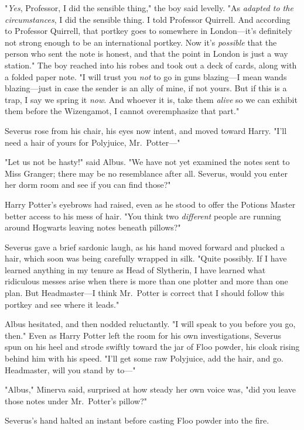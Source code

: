 "\emph{Yes}, Professor, I did the sensible thing," the boy said levelly. "As \emph{adapted to the circumstances}, I did the sensible thing. I told Professor Quirrell. And according to Professor Quirrell, that portkey goes to somewhere in London---it's definitely not strong enough to be an international portkey. Now it's \emph{possible} that the person who sent the note is honest, and that the point in London is just a way station." The boy reached into his robes and took out a deck of cards, along with a folded paper note. "I will trust you \emph{not} to go in guns blazing---I mean wands blazing---just in case the sender is an ally of mine, if not yours. But if this is a trap, I say we spring it \emph{now}. And whoever it is, take them \emph{alive} so we can exhibit them before the Wizengamot, I cannot overemphasize that part."

Severus rose from his chair, his eyes now intent, and moved toward Harry. "I'll need a hair of yours for Polyjuice, Mr.~Potter---"

"Let us not be hasty!" said Albus. "We have not yet examined the notes sent to Miss Granger; there may be no resemblance after all. Severus, would you enter her dorm room and see if you can find those?"

Harry Potter's eyebrows had raised, even as he stood to offer the Potions Master better access to his mess of hair. "You think two \emph{different} people are running around Hogwarts leaving notes beneath pillows?"

Severus gave a brief sardonic laugh, as his hand moved forward and plucked a hair, which soon was being carefully wrapped in silk. "Quite possibly. If I have learned anything in my tenure as Head of Slytherin, I have learned what ridiculous messes arise when there is more than one plotter and more than one plan. But Headmaster---I think Mr.~Potter is correct that I should follow this portkey and see where it leads."

Albus hesitated, and then nodded reluctantly. "I will speak to you before you go, then."
\sbreak
Even as Harry Potter left the room for his own investigations, Severus spun on his heel and strode swiftly toward the jar of Floo powder, his cloak rising behind him with his speed. "I'll get some raw Polyjuice, add the hair, and go. Headmaster, will you stand by to---"

"Albus," Minerva said, surprised at how steady her own voice was, "did you leave those notes under Mr.~Potter's pillow?"

Severus's hand halted an instant before casting Floo powder into the fire.


